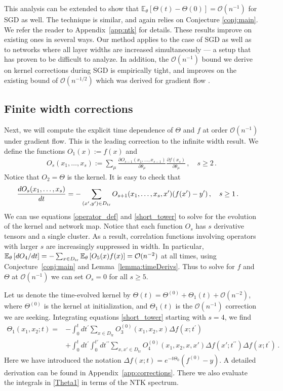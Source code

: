 \documentclass[english]{article}
\newcommand{\cO}{\ensuremath{\mathcal{O}}}
\newcommand{\es}[2] {\begin{align} \label{#1} #2 \end{align}}
\newcommand{\lexpp}[1]{\mathbb{E}_{#1}\left[}
\newcommand{\rexp}{\right]}
\newcommand{\pcite}[1]{\cite{#1}}
\begin{document}
This analysis can be extended to show that $\lexpp{\theta} \Theta(t) - \Theta(0) \rexp = \cO(n^{-1})$ for SGD as well. The technique is similar, and again relies on Conjecture \ref{conj:main}. We refer the reader to Appendix~\ref{app:ntk} for details.
These results improve on existing ones in several ways.
  Our method applies to the case of SGD as well as to networks where all layer widths are increased simultaneously --- a setup that has proven to be difficult to analyze.
  In addition, the $\cO(n^{-1})$ bound we derive on kernel corrections during SGD is empirically tight, and improves on the existing bound of $\cO(n^{-1/2})$ which was derived for gradient flow \pcite{ntk}.


\subsection{Finite width corrections}

Next, we will compute the explicit time dependence of $\Theta$ and $f$ at order $\cO(n^{-1})$ under gradient flow.
This is the leading correction to the infinite width result.
We define the functions $O_1(x):=f(x)$ and
\es{operator_def}{
  O_{s}(x_1,\ldots,x_{s}):=\sum_{\mu}\frac{\partial O_{s-1}(x_1,\ldots,x_{s-1})}{\partial\theta_{\mu}}\frac{\partial f(x_{s})}{\partial\theta_\mu}\,,
  \quad s \ge 2 \,.
}
Notice that $O_2 = \Theta$ is the kernel.
It is easy to check that
\es{short_tower}{
\frac{dO_s(x_1,\ldots,x_{s})}{dt}& =-\sum_{(x',y')\in\Dtr} O_{s+1}(x_1,\ldots,x_{s},x')(f(x')-y')\,, \quad s \ge 1 \,.
}
    We can use equations \eqref{operator_def} and \eqref{short_tower} to solve for the evolution of the kernel and network map. Notice that each function $O_s$ has $s$ derivative tensors and a single cluster. As a result, correlation functions involving operators with larger $s$ are increasingly suppressed in width.
In particular, $\lexpp{\theta}dO_4/dt\rexp=-\sum_{x\in\Dtr}\lexpp{\theta}O_5(x)f(x)\rexp = \cO(n^{-2})$ at all times, using Conjecture~\ref{conj:main} and Lemma~\ref{lemma:timeDerivs}. Thus to solve for $f$ and $\Theta$ at $\mathcal{O}(n^{-1})$ we can set $O_{s}=0$ for all $s\geq5$. 

Let us denote the time-evolved kernel by $\Theta(t)=\Theta^{(0)}+\Theta_{1}(t)+\mathcal{O}(n^{-2})$, where $\Theta^{(0)}$ is the kernel at initialization, and $\Theta_1(t)$ is the $\cO(n^{-1})$ correction we are seeking.
Integrating equations \eqref{short_tower} starting with $s=4$, we find
\es{Theta1}{
\Theta_{1}(x_1,x_2; t)=&-\int_{0}^{t}dt^{\prime}\sum_{x\in D_{\textrm{tr}}}O_3^{(0)}(x_1,x_2,x)\Delta f(x;t^{\prime})\nonumber\\
&+\int_{0}^{t}dt^{\prime}\int_{0}^{t'}dt^{\prime\prime}\sum_{x,x'\in D_{\textrm{tr}}}O_4^{(0)}(x_1,x_2,x,x')\Delta f(x';t^{\prime\prime})\Delta f(x;t^{\prime}) \,.
}
Here we have introduced the notation $\Delta f(x;t)=e^{-t \Theta_0}(f^{(0)}-y)$.
A detailed derivation can be found in Appendix~\ref{app:corrections}.
There we also evaluate the integrals in \eqref{Theta1} in terms of the NTK spectrum.
\end{document}
